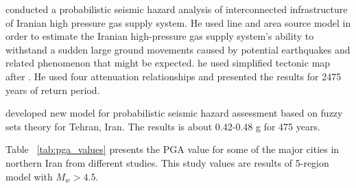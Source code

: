 \noindent
\citet{Golara2014} conducted a probabilistic seismic hazard analysis of interconnected infrastructure of Iranian high pressure gas supply system. He used line and area source model in order to estimate the Iranian  high-pressure gas supply system's ability to withstand a sudden large ground movements caused by potential earthquakes and related phenomenon that might be expected. he used simplified tectonic map after \citet{Alavi1991}. He used four attenuation relationships and presented the results for 2475 years of return period. 

\noindent
\citet{Boostan2015} developed new model for probabilistic seismic hazard assessment based on fuzzy sets theory for Tehran, Iran. The results is about 0.42-0.48 g for 475 years. 

Table ~\ref{tab:pga_values} presents the PGA value for some of the major cities in northern Iran from different studies. This study values are results of 5-region model with $M_w > 4.5 $.



